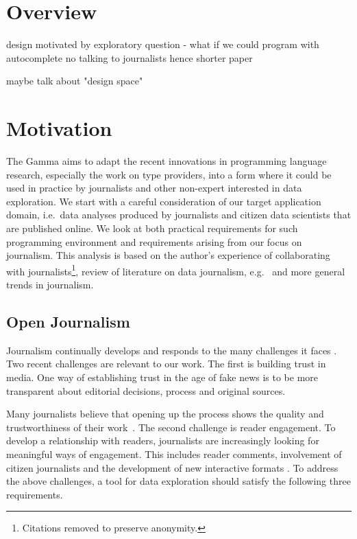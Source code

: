 \documentclass[manuscript,review,anonymous]{acmart}
\begin{document}
\section{Overview}

design motivated by exploratory question - what if we could program with autocomplete
no talking to journalists hence shorter paper

maybe talk about "design space"

\newpage


\section{Motivation}
\label{sec:motivation}

The Gamma aims to adapt the recent innovations in programming language research, especially the
work on type providers, into a form where it could be used in practice by journalists and other
non-expert interested in data exploration. We start with a careful consideration of our target
application domain, i.e.~data analyses produced by journalists and citizen data scientists that
are published online. We look at both practical requirements for such programming environment
and requirements arising from our focus on journalism. This analysis is based on the author's
experience of collaborating with journalists\footnote{Citations removed to preserve anonymity.},
review of literature on data journalism, e.g.~\cite{ddj,edcj17,edcj18} and more general trends in
journalism.

\subsection{Open Journalism}
Journalism continually develops and responds to the many challenges it faces \cite{future}.
Two recent challenges are relevant to our work. The first is building trust in media.
One way of establishing trust in the age of fake news is to be more transparent about editorial
decisions, process and original sources.

Many journalists believe that opening up the process
shows the quality and trustworthiness of their work~\cite{transparency}.
The second challenge is reader engagement. To develop a relationship with readers, journalists are
increasingly looking for meaningful ways of engagement. This includes reader comments, involvement
of citizen journalists \cite{comments,citizen} and the development of new interactive formats
\cite{youdraw}. To address the above challenges, a tool for data exploration should satisfy the
following three requirements.
\end{document}
